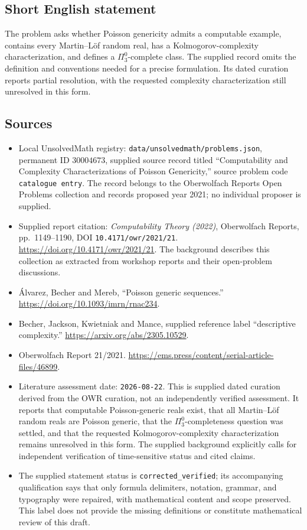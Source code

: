 \documentclass[11pt]{article}
\begin{document}
\subsection{Short English statement}
The problem asks whether Poisson genericity admits a computable example, contains every Martin--L\"of random real, has a Kolmogorov-complexity characterization, and defines a \(\Pi^0_3\)-complete class. The supplied record omits the definition and conventions needed for a precise formulation. Its dated curation reports partial resolution, with the requested complexity characterization still unresolved in this form.
\subsection{Sources}
\begin{itemize}
\item Local UnsolvedMath registry: \texttt{data/unsolvedmath/problems.json}, permanent ID \(30004673\), supplied source record titled ``Computability and Complexity Characterizations of Poisson Genericity,'' source problem code \texttt{catalogue entry}. The record belongs to the Oberwolfach Reports Open Problems collection and records proposed year 2021; no individual proposer is supplied.
\item Supplied report citation: \emph{Computability Theory (2022)}, Oberwolfach Reports, pp.~1149--1190, DOI \texttt{10.4171/owr/2021/21}. \url{https://doi.org/10.4171/owr/2021/21}. The background describes this collection as extracted from workshop reports and their open-problem discussions.
\item \textrm{\'Alvarez}, Becher and Mereb, ``Poisson generic sequences.'' \url{https://doi.org/10.1093/imrn/rnac234}.
\item Becher, Jackson, Kwietniak and Mance, supplied reference label ``descriptive complexity.'' \url{https://arxiv.org/abs/2305.10529}.
\item Oberwolfach Report 21/2021. \url{https://ems.press/content/serial-article-files/46899}.
\item Literature assessment date: \texttt{2026-08-22}. This is supplied dated curation derived from the OWR curation, not an independently verified assessment. It reports that computable Poisson-generic reals exist, that all Martin--L\"of random reals are Poisson generic, that the \(\Pi^0_3\)-completeness question was settled, and that the requested Kolmogorov-complexity characterization remains unresolved in this form. The supplied background explicitly calls for independent verification of time-sensitive status and cited claims.
\item The supplied statement status is \texttt{corrected\_verified}; its accompanying qualification says that only formula delimiters, notation, grammar, and typography were repaired, with mathematical content and scope preserved. This label does not provide the missing definitions or constitute mathematical review of this draft.
\end{itemize}
\end{document}
